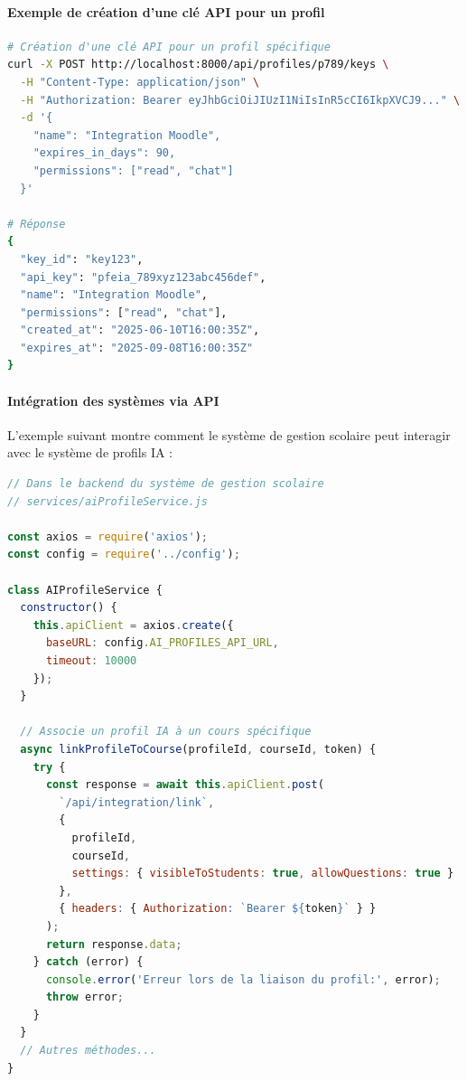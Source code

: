 \paragraph{Exemple de création d'une clé API pour un profil}

\begin{lstlisting}[style=codestyle, language=bash]
# Création d'une clé API pour un profil spécifique
curl -X POST http://localhost:8000/api/profiles/p789/keys \
  -H "Content-Type: application/json" \
  -H "Authorization: Bearer eyJhbGciOiJIUzI1NiIsInR5cCI6IkpXVCJ9..." \
  -d '{
    "name": "Integration Moodle",
    "expires_in_days": 90,
    "permissions": ["read", "chat"]
  }'

# Réponse
{
  "key_id": "key123",
  "api_key": "pfeia_789xyz123abc456def",
  "name": "Integration Moodle",
  "permissions": ["read", "chat"],
  "created_at": "2025-06-10T16:00:35Z",
  "expires_at": "2025-09-08T16:00:35Z"
}
\end{lstlisting}

\paragraph{Intégration des systèmes via API}

L'exemple suivant montre comment le système de gestion scolaire peut interagir avec le système de profils IA :

\begin{lstlisting}[style=codestyle, language=JavaScript]
// Dans le backend du système de gestion scolaire
// services/aiProfileService.js

const axios = require('axios');
const config = require('../config');

class AIProfileService {
  constructor() {
    this.apiClient = axios.create({
      baseURL: config.AI_PROFILES_API_URL,
      timeout: 10000
    });
  }

  // Associe un profil IA à un cours spécifique
  async linkProfileToCourse(profileId, courseId, token) {
    try {
      const response = await this.apiClient.post(
        `/api/integration/link`,
        {
          profileId,
          courseId,
          settings: { visibleToStudents: true, allowQuestions: true }
        },
        { headers: { Authorization: `Bearer ${token}` } }
      );
      return response.data;
    } catch (error) {
      console.error('Erreur lors de la liaison du profil:', error);
      throw error;
    }
  }
  // Autres méthodes...
}
\end{lstlisting}

